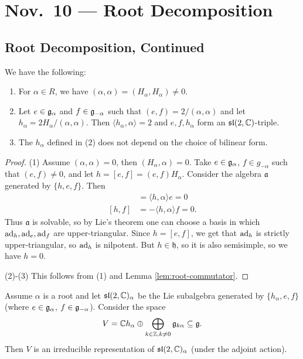 \chapter{Nov.~10 --- Root Decomposition}

\section{Root Decomposition, Continued}
\begin{lemma}
  We have the following:
  \begin{enumerate}
    \item For $\alpha \in R$, we have
      $(\alpha, \alpha) = (H_\alpha, H_\alpha) \ne 0$.
    \item Let $e \in \mathfrak{g}_\alpha$ and
      $f \in \mathfrak{g}_{-\alpha}$
      such that $(e, f) = 2 / (\alpha, \alpha)$
      and let $h_\alpha = 2H_\alpha / (\alpha, \alpha)$.
      Then $\langle h_\alpha, \alpha \rangle = 2$
      and $e, f, h_\alpha$ form an
      $\mathfrak{sl}(2, \mathbb{C})$-triple.
    \item The $h_\alpha$ defined in
      (2) does not depend on the choice of
      bilinear form.
  \end{enumerate}
\end{lemma}

\begin{proof}
  (1) Assume $(\alpha, \alpha) = 0$,
  then $(H_\alpha, \alpha) = 0$.
  Take $e \in \mathfrak{g}_\alpha$, $f \in g_{-\alpha}$
  such that $(e, f) \ne 0$, and
  let $h = [e, f] = (e, f) H_\alpha$.
  Consider the algebra $\mathfrak{a}$ generated by
  $\{h, e, f\}$. Then
  \begin{align*}
    [h, e] &= \langle h, \alpha \rangle e = 0 \\
    [h, f] &= -\langle h, \alpha \rangle f = 0.
  \end{align*}
  Thus $\mathfrak{a}$ is solvable, so by
  Lie's theorem one can choose a basis in
  which $\operatorname{ad}_h, \operatorname{ad}_e, \operatorname{ad}_f$ are
  upper-triangular. Since
  $h = [e, f]$, we get that $\operatorname{ad}_h$ is
  strictly upper-triangular,
  so $\operatorname{ad}_h$ is nilpotent. But
  $h \in \mathfrak{h}$, so it is
  also semisimple, so we have
  $h = 0$.

  (2)-(3) This follows from (1) and
  Lemma \ref{lem:root-commutator}.
\end{proof}

\begin{lemma}
  Assume $\alpha$ is a root and let
  $\mathfrak{sl}(2, \mathbb{C})_\alpha$ be the
  Lie subalgebra generated by
  $\{h_\alpha, e, f\}$ (where
  $e \in \mathfrak{g}_\alpha$, $f \in \mathfrak{g}_{-\alpha}$).
  Consider the space
  \[
    V = \mathbb{C} h_\alpha \oplus
    \bigoplus_{k \in \mathbb{Z}, k \ne 0} \mathfrak{g}_{k\alpha} \subseteq \mathfrak{g}.
  \]
  Then $V$ is an irreducible
  representation of $\mathfrak{sl}(2, \mathbb{C})_\alpha$ (under the adjoint action).
\end{lemma}

